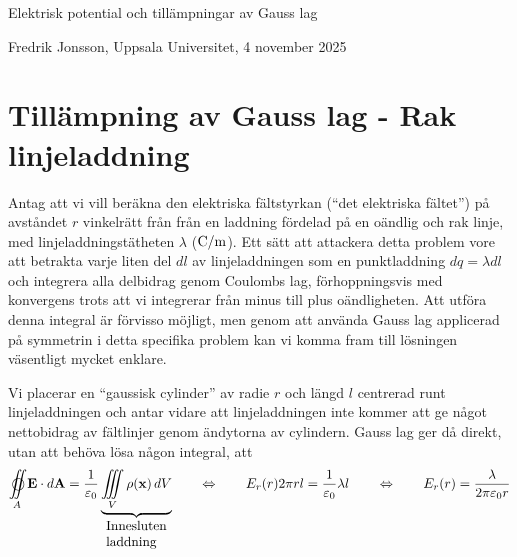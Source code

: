 \centerline{\twelvesc Elektrisk potential och till{\"a}mpningar av Gauss lag}
\centerline{Fredrik Jonsson, Uppsala Universitet, 4 november 2025}
\vskip24pt

\section{Till{\"a}mpning av Gauss lag - Rak linjeladdning}
Antag att vi vill ber{\"a}kna den elektriska f{\"a}ltstyrkan (``det elektriska f{\"a}ltet'') p{\aa} avst{\aa}ndet $r$ vinkelr{\"a}tt fr{\aa}n fr{\aa}n en laddning f{\"o}rdelad p{\aa} en o{\"a}ndlig och rak linje, med linjeladdningst{\"a}theten $\lambda$ (${\rm C}/{\rm m}$). Ett s{\"a}tt att attackera detta problem vore att betrakta varje liten del $dl$ av linjeladdningen som en punktladdning $dq=\lambda dl$ och integrera alla delbidrag genom Coulombs lag, f{\"o}rhoppningsvis med konvergens trots att vi integrerar fr{\aa}n minus till plus o{\"a}ndligheten. Att utf{\"o}ra denna integral {\"a}r f{\"o}rvisso m{\"o}jligt, men genom att anv{\"a}nda Gauss lag applicerad p{\aa} symmetrin i detta specifika problem kan vi komma fram till l{\"o}sningen v{\"a}sentligt mycket enklare.
\bigskip
\centerline{}
\medskip
\noindent
Vi placerar en ``gaussisk cylinder'' av radie $r$ och l{\"a}ngd $l$ centrerad runt linjeladdningen och antar vidare att linjeladdningen inte kommer att ge n{\aa}got nettobidrag av f{\"a}ltlinjer genom {\"a}ndytorna av cylindern. Gauss lag ger d{\aa} direkt, utan att beh{\"o}va l{\"o}sa n{\aa}gon integral, att
$$
  \oiint_A {\bf E}\cdot d{\bf A}
     ={{1}\over{\varepsilon_0}}
       \underbrace{
         \iiint_V\rho({\bf x})\,dV
       }_{\vbox{\hbox{Innesluten}\hbox{laddning}}}
  \qquad\Leftrightarrow\qquad
  E_r(r)2\pi r l = {{1}\over{\varepsilon_0}}\lambda l
  \qquad\Leftrightarrow\qquad
  E_r(r) = {{\lambda}\over{2\pi \varepsilon_0 r}}
$$

